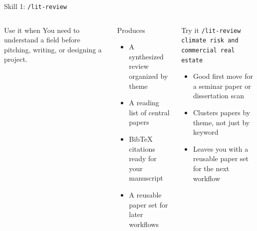 \documentclass[aspectratio=169,professionalfonts]{beamer}
\begin{document}
\begin{frame}[t]{Skill 1: \texttt{/lit-review}}
\small
\begin{columns}[T,onlytextwidth]
\begin{block}{Use it when}
You need to understand a field before pitching, writing, or designing a project.
\end{block}
\begin{block}{Produces}
\begin{itemize}
  \item A synthesized review organized by theme
  \item A reading list of central papers
  \item BibTeX citations ready for your manuscript
  \item A reusable paper set for later workflows
\end{itemize}
\end{block}
\begin{exampleblock}{Try it}
\texttt{/lit-review climate risk and commercial real estate}
\medskip
\begin{itemize}
  \item Good first move for a seminar paper or dissertation scan
  \item Clusters papers by theme, not just by keyword
  \item Leaves you with a reusable paper set for the next workflow
\end{itemize}
\end{exampleblock}
\end{columns}
\end{frame}
\end{document}
